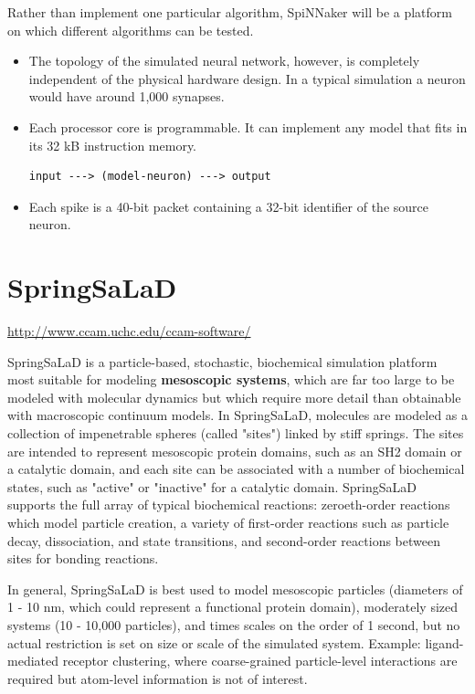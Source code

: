 Rather than implement one particular algorithm, SpiNNaker will be a platform on
which different algorithms can be tested.
\begin{itemize}
  \item  The topology of the simulated neural network, however, is completely
  independent of the physical hardware design. In a typical simulation a neuron would have around 1,000 synapses. 
  
  \item  Each processor core is programmable.
It can implement any model that fits in its 32 kB instruction memory. 
\begin{verbatim}
input ---> (model-neuron) ---> output
\end{verbatim}
  
  \item Each spike is a 40-bit packet containing a 32-bit identifier of the source
neuron. 
  
\end{itemize}


\section{SpringSaLaD}
\label{sec:SpringSaLaD}

\url{http://www.ccam.uchc.edu/ccam-software/}

SpringSaLaD is a particle-based, stochastic, biochemical simulation platform
most suitable for modeling {\bf mesoscopic systems}, which are far too large to
be modeled with molecular dynamics but which require more detail than obtainable
with macroscopic continuum models. In SpringSaLaD, molecules are modeled as a
collection of impenetrable spheres (called "sites") linked by stiff springs. The
sites are intended to represent mesoscopic protein domains, such as an SH2
domain or a catalytic domain, and each site can be associated with a number of
biochemical states, such as "active" or "inactive" for a catalytic domain.
SpringSaLaD supports the full array of typical biochemical reactions:
zeroeth-order reactions which model particle creation, a variety of first-order
reactions such as particle decay, dissociation, and state transitions, and
second-order reactions between sites for bonding reactions.


 In general, SpringSaLaD is best used to model mesoscopic particles (diameters
 of 1 - 10 nm, which could represent a functional protein domain), moderately
 sized systems (10 - 10,000 particles), and times scales on the order of 1
 second, but no actual restriction is set on size or scale of the simulated
 system.
 Example:  ligand-mediated receptor clustering, where coarse-grained
 particle-level interactions are required but atom-level information is not of
 interest.
 
